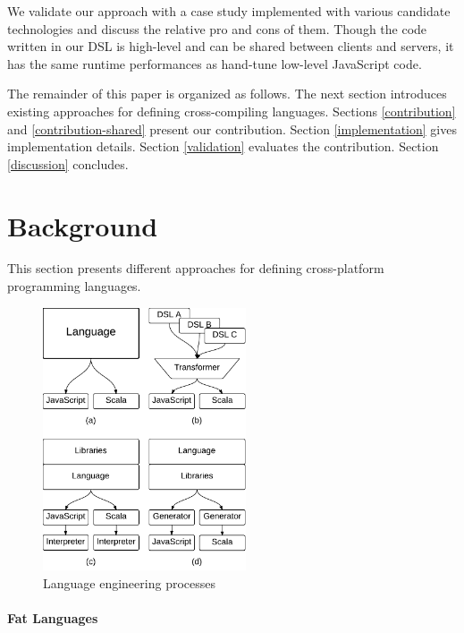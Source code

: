 \documentclass[preprint]{sigplanconf}
\begin{document}
We validate our approach with a case study implemented with various candidate technologies and discuss the relative
pro and cons of them. Though the code written in our DSL is high-level and can be shared between clients and servers,
it has the same runtime performances as hand-tune low-level JavaScript code.

The remainder of this paper is organized as follows. The next section introduces existing approaches for defining
cross-compiling languages. Sections \ref{contribution} and \ref{contribution-shared} present our contribution.
Section \ref{implementation} gives implementation details. Section \ref{validation} evaluates the contribution.
Section \ref{discussion} concludes.

\section{Background}

This section presents different approaches for defining cross-platform programming languages.

\begin{figure}
\begin{center}
\includegraphics[width=6cm]{langs.pdf}
\end{center}
\caption{Language engineering processes}
\label{langs}
\end{figure}

\paragraph{Fat Languages}
\end{document}
